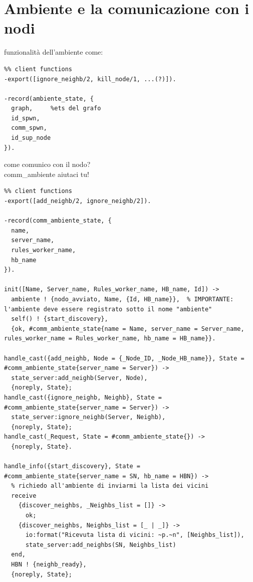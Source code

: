 \documentclass[italian]{memoir}
\begin{document}
\section{Ambiente e la comunicazione con i nodi}
funzionalità dell'ambiente come:
\begin{verbatim}
%% client functions
-export([ignore_neighb/2, kill_node/1, ...(?)]).

-record(ambiente_state, {
  graph,     %ets del grafo
  id_spwn,
  comm_spwn,
  id_sup_node
}).
\end{verbatim}

come comunico con il nodo?\\
comm\_ambiente aiutaci tu!
\begin{verbatim}
%% client functions
-export([add_neighb/2, ignore_neighb/2]).

-record(comm_ambiente_state, {
  name,
  server_name,
  rules_worker_name,
  hb_name
}).

init([Name, Server_name, Rules_worker_name, HB_name, Id]) ->
  ambiente ! {nodo_avviato, Name, {Id, HB_name}},  % IMPORTANTE: l'ambiente deve essere registrato sotto il nome "ambiente"
  self() ! {start_discovery},
  {ok, #comm_ambiente_state{name = Name, server_name = Server_name, rules_worker_name = Rules_worker_name, hb_name = HB_name}}.

handle_cast({add_neighb, Node = {_Node_ID, _Node_HB_name}}, State = #comm_ambiente_state{server_name = Server}) ->
  state_server:add_neighb(Server, Node),
  {noreply, State};
handle_cast({ignore_neighb, Neighb}, State = #comm_ambiente_state{server_name = Server}) ->
  state_server:ignore_neighb(Server, Neighb),
  {noreply, State};
handle_cast(_Request, State = #comm_ambiente_state{}) ->
  {noreply, State}.
  
handle_info({start_discovery}, State = #comm_ambiente_state{server_name = SN, hb_name = HBN}) ->
  % richiedo all'ambiente di inviarmi la lista dei vicini
  receive
    {discover_neighbs, _Neighbs_list = []} ->
      ok;
    {discover_neighbs, Neighbs_list = [_ | _]} ->
      io:format("Ricevuta lista di vicini: ~p.~n", [Neighbs_list]),
      state_server:add_neighbs(SN, Neighbs_list)
  end,
  HBN ! {neighb_ready},
  {noreply, State};
  
\end{verbatim}
%
%
%
\end{document}
